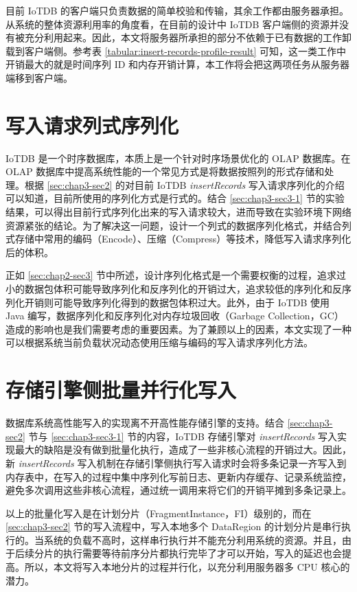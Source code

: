 目前 IoTDB 的客户端只负责数据的简单校验和传输，其余工作都由服务器承担。从系统的整体资源利用率的角度看，在目前的设计中 IoTDB 客户端侧的资源并没有被充分利用起来。因此，本文将服务器所承担的部分不依赖于已有数据的工作卸载到客户端侧。参考表 \ref{tabular:insert-records-profile-result} 可知，这一类工作中开销最大的就是时间序列 ID 和内存开销计算，本工作将会把这两项任务从服务器端移到客户端。

\section{写入请求列式序列化}
IoTDB 是一个时序数据库，本质上是一个针对时序场景优化的 OLAP 数据库\cite{谭新宇2023一致性协议}。在 OLAP 数据库中提高系统性能的一个常见方式是将数据按照列的形式存储和处理。根据 \ref{sec:chap3-sec2} 的对目前 IoTDB \emph{insertRecords} 写入请求序列化的介绍可以知道，目前所使用的序列化方式是行式的。结合 \ref{sec:chap3-sec3-1} 节的实验结果，可以得出目前行式序列化出来的写入请求较大，进而导致在实验环境下网络资源紧张的结论。为了解决这一问题，设计一个列式的数据序列化格式，并结合列式存储中常用的编码（Encode）、压缩（Compress）等技术，降低写入请求序列化后的体积。

正如 \ref{sec:chap2-sec3} 节中所述，设计序列化格式是一个需要权衡的过程，追求过小的数据包体积可能导致序列化和反序列化的开销过大，追求较低的序列化和反序列化开销则可能导致序列化得到的数据包体积过大。此外，由于 IoTDB 使用 Java 编写，数据序列化和反序列化对内存垃圾回收（Garbage Collection，GC）造成的影响也是我们需要考虑的重要因素。为了兼顾以上的因素，本文实现了一种可以根据系统当前负载状况动态使用压缩与编码的写入请求序列化方法。

\section{存储引擎侧批量并行化写入}
数据库系统高性能写入的实现离不开高性能存储引擎的支持。结合 \ref{sec:chap3-sec2} 节与 \ref{sec:chap3-sec3-1} 节的内容，IoTDB 存储引擎对 \emph{insertRecords} 写入实现最大的缺陷是没有做到批量化执行，造成了一些非核心流程的开销过大。因此，新 \emph{insertRecords} 写入机制在存储引擎侧执行写入请求时会将多条记录一齐写入到内存表中，在写入的过程中集中序列化写前日志、更新内存缓存、记录系统监控，避免多次调用这些非核心流程，通过统一调用来将它们的开销平摊到多条记录上。

以上的批量化写入是在计划分片（FragmentInstance，FI）级别的，而在 \ref{sec:chap3-sec2} 节的写入流程中，写入本地多个 DataRegion 的计划分片是串行执行的。当系统的负载不高时，这样串行执行并不能充分利用系统的资源。并且，由于后续分片的执行需要等待前序分片都执行完毕了才可以开始，写入的延迟也会提高。所以，本文将写入本地分片的过程并行化，以充分利用服务器多 CPU 核心的潜力。

